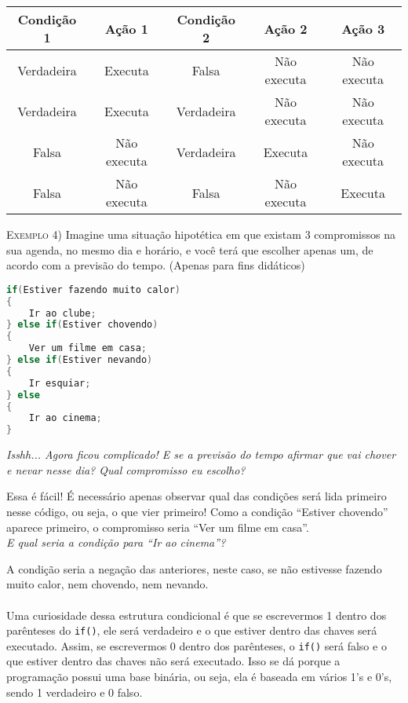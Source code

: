     \begin{center}
    \begin{tabular}{|c|c|c|c|c|}
    \hline
    Condição 1 & Ação 1 & Condição 2 & Ação 2 & Ação 3\\ \hline
    Verdadeira & Executa & Falsa & Não executa & Não executa \\ \hline
    Verdadeira & Executa & Verdadeira & Não executa & Não executa \\ \hline
    Falsa & Não executa & Verdadeira & Executa & Não executa \\ \hline
    Falsa & Não executa & Falsa & Não executa & Executa \\ \hline
    \end{tabular}
    \end{center}
    
    \textsc{Exemplo 4)} Imagine uma situação hipotética em que existam 3 compromissos na sua agenda, no mesmo dia e horário, e você terá que escolher apenas um, de acordo com a previsão do tempo. (Apenas para fins didáticos)
    
    \begin{lstlisting}[language=C]
if(Estiver fazendo muito calor)
{
    Ir ao clube;
} else if(Estiver chovendo)
{
    Ver um filme em casa;
} else if(Estiver nevando)
{
    Ir esquiar;
} else
{
    Ir ao cinema;
}
\end{lstlisting}
    
    \textit{Isshh... Agora ficou complicado! E se a previsão do tempo afirmar que vai chover e nevar nesse dia? Qual compromisso eu escolho?} \par
    Essa é fácil! É necessário apenas observar qual das condições será lida primeiro nesse código, ou seja, o que vier primeiro! Como a condição ``Estiver chovendo'' aparece primeiro, o compromisso seria ``Ver um filme em casa''. \\

    \textit{E qual seria a condição para ``Ir ao cinema''?} \par
    A condição seria a negação das anteriores, neste caso, se não estivesse fazendo muito calor, nem chovendo, nem nevando.
    
    \paragraph{}
    Uma curiosidade dessa estrutura condicional é que se escrevermos 1 dentro dos parênteses do \lstinline[columns=fixed]{if()}, ele será verdadeiro e o que estiver dentro das chaves será executado. Assim, se escrevermos 0 dentro dos parênteses, o \lstinline[columns=fixed]{if()} será falso e o que estiver dentro das chaves não será executado. Isso se dá porque a programação possui uma base binária, ou seja, ela é baseada em vários 1's e 0's, sendo 1 verdadeiro e 0 falso.
    
